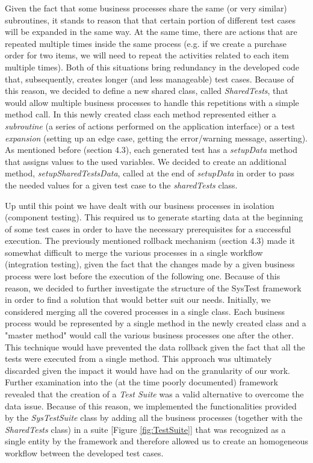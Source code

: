Given the fact that some business processes share the same (or very similar) subroutines, it stands to reason that that certain portion of different test cases will be expanded in the same way. At the same time, there are actions that are repeated multiple times inside the same process (e.g. if we create a purchase order for two items, we will need to repeat the activities related to each item multiple times). Both of this situations bring redundancy in the developed code that, subsequently, creates longer (and less manageable) test cases. Because of this reason, we decided to define a new shared class, called \textit{SharedTests}, that would allow multiple business processes to handle this repetitions with a simple method call. In this newly created class each method represented either a \textit{subroutine} (a series of actions performed on the application interface) or a test \textit{expansion} (setting up an edge case, getting the error/warning message, asserting). As mentioned before (section 4.3), each generated test has a \textit{setupData} method that assigns values to the used variables. We decided to create an additional method, \textit{setupSharedTestsData}, called at the end of \textit{setupData} in order to pass the needed values for a given test case to the \textit{sharedTests} class.

Up until this point we have dealt with our business processes in isolation (component testing). This required us to generate starting data at the beginning of some test cases in order to have the necessary prerequisites for a successful execution. The previously mentioned rollback mechanism (section 4.3) made it somewhat difficult to merge the various processes in a single workflow (integration testing), given the fact that the changes made by a given business process were lost before the execution of the following one. Because of this reason, we decided to further investigate the structure of the SysTest framework in order to find a solution that would better suit our needs. Initially, we considered merging all the covered processes in a single class. Each business process would be represented by a single method in the newly created class and a "master method" would call the various business processes one after the other. This technique would have prevented the data rollback given the fact that all the tests were executed from a single method. This approach was ultimately discarded given the impact it would have had on the granularity of our work. 
Further examination into the (at the time poorly documented) framework revealed that the creation of a \textit{Test Suite} was a valid alternative to overcome the data issue. Because of this reason, we implemented the functionalities provided by the \textit{SysTestSuite} class by adding all the business processes (together with the \textit{SharedTests} class) in a suite [Figure \ref{fig:TestSuite}] that was recognized as a single entity by the framework and therefore allowed us to create an homogeneous workflow between the developed test cases.

